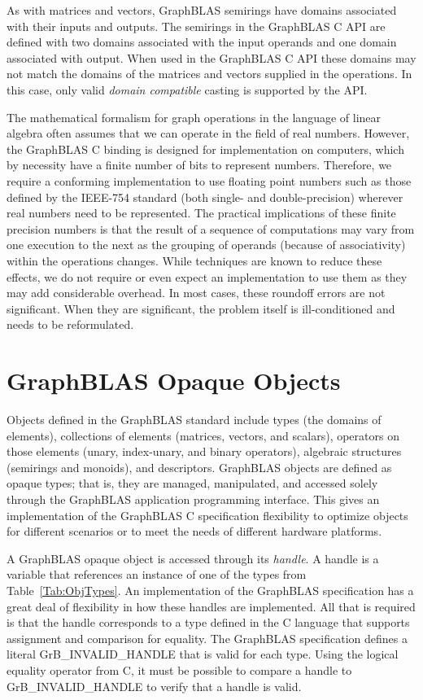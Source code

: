 As with matrices and vectors, GraphBLAS semirings have domains
associated with their inputs and outputs.  The semirings in the 
GraphBLAS C API are defined with two domains associated with the input operands and one 
domain associated with output.  When used in the GraphBLAS C API these
domains may not match the domains of the matrices and vectors supplied in
the operations.  In this case, only valid \emph{domain compatible} casting 
is supported by the API.

The mathematical formalism for graph operations in the language of 
linear algebra often assumes that we can operate in the field of real numbers. 
However, the GraphBLAS C binding is designed for implementation on computers, 
which by necessity have a finite number of bits to represent numbers. 
Therefore, we require a conforming implementation to use floating point 
numbers such as those defined by the IEEE-754 standard (both single- and double-precision) 
wherever real numbers need to be represented. The practical implications of 
these finite precision numbers is that the result of a sequence of 
computations may vary from one execution to the next as the grouping of operands
(because of associativity) within the operations changes.  While techniques are known to 
reduce these effects, we do not require or even expect an implementation 
to use them as they may add considerable overhead. In most 
cases, these roundoff errors are not significant. When they are significant, 
the problem itself is ill-conditioned and needs to be reformulated.


\section{GraphBLAS Opaque Objects}

Objects defined in the GraphBLAS standard include types (the domains of 
elements), collections of elements (matrices, vectors, and scalars), operators 
on those elements (unary, index-unary, and binary operators), algebraic 
structures (semirings and monoids), and descriptors.   GraphBLAS objects are 
defined as opaque types; that is, they are managed, manipulated, and accessed 
solely through the GraphBLAS application programming interface. This gives an 
implementation of the GraphBLAS C specification flexibility to optimize objects 
for different scenarios or to meet the needs of different hardware platforms.

A GraphBLAS opaque object is accessed through its \emph{handle}.  A handle is 
a variable that references an instance of one of the types from 
Table~\ref{Tab:ObjTypes}.  An implementation of the GraphBLAS specification 
has a great deal of flexibility in how these handles are implemented.  All 
that is required is that the handle corresponds to a type defined in the 
C language that supports assignment and comparison for equality.  The
GraphBLAS specification defines a literal {\sf GrB\_INVALID\_HANDLE} that is 
valid for each type.  Using the logical equality operator from C, it must be 
possible to compare a handle to {\sf GrB\_INVALID\_HANDLE} to verify that a 
handle is valid.


